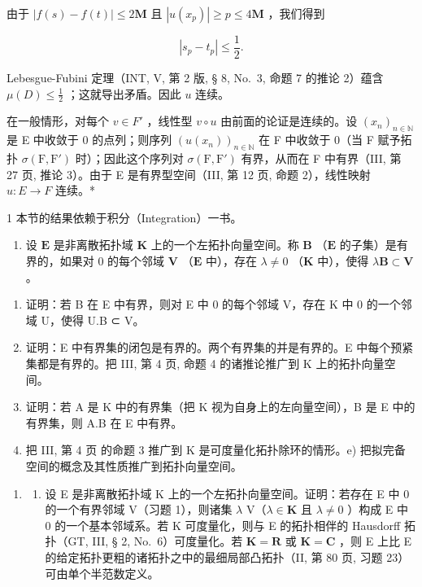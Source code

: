 由于 \(|f(s) - f(t)| \leqslant 2\mathbf{M}\) 且 \(|u(x_p)| \geqslant p \leqslant 4\mathbf{M}\) ，我们得到

\[
\left| s _ {p} - t _ {p} \right| \leqslant \frac {1}{2}.
\]

Lebesgue-Fubini 定理（INT, V, 第 2 版, § 8, No.~3, 命题 7 的推论 2）蕴含 \(\mu(D) \leqslant \frac{1}{2}\) ；这就导出矛盾。因此 \(u\) 连续。

在一般情形，对每个 \(v \in F'\) ，线性型 \(v \circ u\) 由前面的论证是连续的。设 \((x_{n})_{n \in \mathbb{N}}\) 是 E 中收敛于 0 的点列；则序列 \((u(x_{n}))_{n \in \mathbb{N}}\) 在 F 中收敛于 0（当 F 赋予拓扑 \(\sigma(\mathrm{F}, \mathrm{F}')\) 时）；因此这个序列对 \(\sigma(\mathrm{F}, \mathrm{F}')\) 有界，从而在 F 中有界（III, 第 27 页, 推论 3）。由于 E 是有界型空间（III, 第 12 页, 命题 2），线性映射 \(u: E \to F\) 连续。*

1 本节的结果依赖于积分（Integration）一书。

\exercisesheading
\exercisegroup

\begin{enumerate}
\def\labelenumi{\arabic{enumi})}
\tightlist
\item
  设 \(\mathbf{E}\) 是非离散拓扑域 \(\mathbf{K}\) 上的一个左拓扑向量空间。称 \(\mathbf{B}\) （\(\mathbf{E}\) 的子集）是有界的，如果对 0 的每个邻域 \(\mathbf{V}\) （\(\mathbf{E}\) 中），存在 \(\lambda \neq 0\) （\(\mathbf{K}\) 中），使得 \(\lambda \mathbf{B} \subset \mathbf{V}\) 。
\end{enumerate}

\begin{enumerate}
\def\labelenumi{\alph{enumi})}
\item
  证明：若 B 在 E 中有界，则对 E 中 0 的每个邻域 V，存在 K 中 0 的一个邻域 U，使得 U.B ⊂ V。
\item
  证明：E 中有界集的闭包是有界的。两个有界集的并是有界的。E 中每个预紧集都是有界的。把 III, 第 4 页, 命题 4 的诸推论推广到 K 上的拓扑向量空间。
\item
  证明：若 A 是 K 中的有界集（把 K 视为自身上的左向量空间），B 是 E 中的有界集，则 A.B 在 E 中有界。
\item
  把 III, 第 4 页 的命题 3 推广到 K 是可度量化拓扑除环的情形。e) 把拟完备空间的概念及其性质推广到拓扑向量空间。
\end{enumerate}

\begin{enumerate}
\def\labelenumi{\arabic{enumi})}
\setcounter{enumi}{1}
\tightlist
\item
  \begin{enumerate}
  \def\labelenumii{\alph{enumii})}
  \tightlist
  \item
    设 E 是非离散拓扑域 K 上的一个左拓扑向量空间。证明：若存在 E 中 0 的一个有界邻域 V（习题 1），则诸集 \(\lambda\) V（\(\lambda \in \mathbf{K}\) 且 \(\lambda \neq 0\) ）构成 E 中 0 的一个基本邻域系。若 K 可度量化，则与 E 的拓扑相伴的 Hausdorff 拓扑（GT, III, § 2, No.~6）可度量化。若 \(\mathbf{K} = \mathbf{R}\) 或 \(\mathbf{K} = \mathbf{C}\) ，则 E 上比 E 的给定拓扑更粗的诸拓扑之中的最细局部凸拓扑（II, 第 80 页, 习题 23）可由单个半范数定义。
  \end{enumerate}
\end{enumerate}

